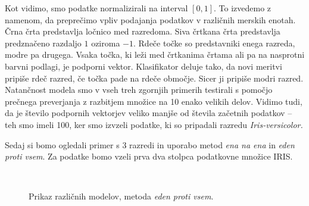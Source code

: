 \documentclass[mat1]{fmfdelo}
\begin{document}
Kot vidimo, smo podatke normalizirali na interval $[0,1]$. To izvedemo z namenom, da preprečimo vpliv podajanja podatkov v različnih merskih enotah. Črna črta predstavlja ločnico med razredoma. Siva črtkana črta predstavlja predznačeno razdaljo $1$ oziroma $-1$. Rdeče točke so predstavniki enega razreda, modre pa drugega. Vsaka točka, ki leži med črtkanima črtama ali pa na nasprotni barvni podlagi, je podporni vektor. Klasifikator deluje tako, da novi meritvi pripiše rdeč razred, če točka pade na rdeče območje. Sicer ji pripiše modri razred. Natančnost modela smo v vseh treh zgornjih primerih testirali s pomočjo prečnega preverjanja z razbitjem množice na 10 enako velikih delov. Vidimo tudi, da je število podpornih vektorjev veliko manjše od števila začetnih podatkov -- teh smo imeli 100, ker smo izvzeli podatke, ki so pripadali razredu \emph{Iris-versicolor.} 

Sedaj si bomo ogledali primer s 3 razredi in uporabo metod \emph{ena na ena} in \emph{eden proti vsem}. Za podatke bomo vzeli prva dva stolpca podatkovne množice IRIS.


\begin{figure}[ht]
	\centering
	\hfill %
	\hfill %
	\\
	\caption{Prikaz različnih modelov, metoda \emph{eden proti vsem}.}
	\label{slikaRazlicniModeliOVA}
\end{figure}
\end{document}
